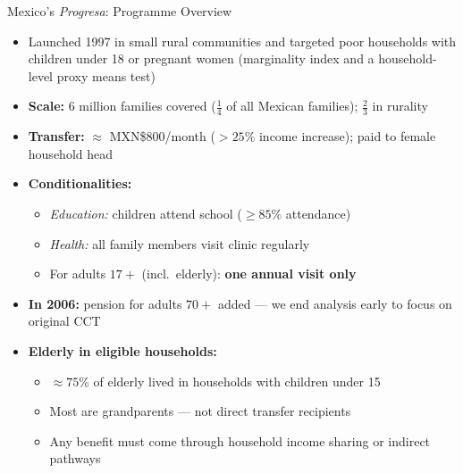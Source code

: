 \documentclass[aspectratio=169,usenames,dvipsnames]{beamer}
\newcommand{\smallcite}[1]{{\footnotesize\textcolor{Blue}{\citep{#1}}}}
\begin{document}
\begin{frame}{Mexico's \textit{Progresa}: Programme Overview}\label{progresa}
\small
\begin{itemize}
  \item[$\circ$] Launched 1997 in small rural communities and targeted poor households with children under 18 or pregnant women (marginality index and a household-level proxy means test)
  \vspace{4pt}
  \item[$\circ$] \textbf{Scale:} 6 million families covered ($\frac{1}{4}$ of all Mexican families); $\frac{2}{3}$ in rurality
  \vspace{4pt}
  
  \item[$\circ$] \textbf{Transfer:} $\approx$ MXN\$800/month ($>25\%$ income increase); paid to female household head
  \vspace{4pt}
  \item[$\circ$] \textbf{Conditionalities:}
    \begin{itemize}
      \item \textit{Education:} children attend school ($\geq 85\%$ attendance)
      \item \textit{Health:} all family members visit clinic regularly
      \item For adults $17+$ (incl.\ elderly): \textbf{one annual visit only}
    \end{itemize}
  \vspace{4pt}
  \item[$\circ$] \textbf{In 2006:} pension for adults $70+$ added --- we end analysis early to focus on original CCT
  \vspace{4pt}
  \item[$\circ$] \textbf{Elderly in eligible households:}
    \begin{itemize}
      \item $\approx 75\%$ of elderly lived in households with children under 15 \smallcite{BehrmanParker2013Demography}
      \item Most are grandparents --- not direct transfer recipients
      \item Any benefit must come through household income sharing or indirect pathways
    \end{itemize}
\end{itemize}
\end{frame}

\end{document}
